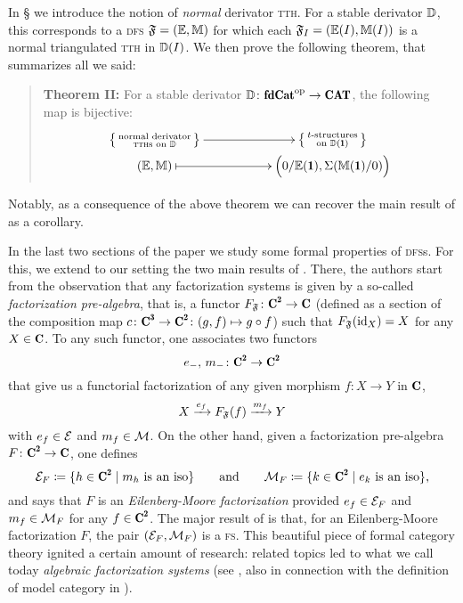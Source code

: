 In § we introduce the notion of \emph{normal} derivator \textsc{tth}. For a stable derivator $\mathbb{D}$, this corresponds to a \textsc{dfs} $\mathfrak{F}=(\mathbb E,\mathbb M)$ for which each $\mathfrak{F}_I=(\mathbb E(I),\mathbb M(I))$ is a normal triangulated \textsc{tth} in $\mathbb{D}(I)$. We then prove the following theorem, that summarizes all we said:
\begin{quote}
\textbf{Theorem II:} For a stable derivator $\D\colon \fincat^\opp\to \Cat$, the following map is bijective:
\[
\xymatrix@R=0pt{
\left\{
{\begin{smallmatrix}
\text{normal derivator}\\
\text{\textsc{tth}s on }\D
\end{smallmatrix}}
\right\}
\ar[rr] &&
\left\{
{\begin{smallmatrix}
\text{$t$-structures}\\
\text{on }\D(\uno)
\end{smallmatrix}}
\right\}\\
(\mathbb E,\mathbb M) \ar@{|->}[rr]&& \Big(0/\mathbb E(\uno), \Sigma(\mathbb M(\uno)/0)\Big) 
}
\]
\end{quote}
Notably, as a consequence of the above theorem we can recover the main result of \cite{Fiorenza2014} as a corollary.

In the last two sections of the paper we study some formal properties of \textsc{dfs}s. For this, we extend to our setting the two main results of \cite{Korostenski199357}. There, the authors start from the observation that any factorization systems is given by a so-called \emph{factorization pre-algebra}, that is, a functor $F_\F\colon \C^\due \to \C$ (defined as a section of the composition map $c\colon \C^\tre \to \C^\due\colon (g,f)\mapsto g\circ f$) such that $F_{\mathfrak{F}}(\operatorname{id}_X)=X$ for any $X\in \C$. To any such functor, one associates two functors
\[
e_{-},\, m_{-}\colon \C^\due\to \C^\due
\]
that give us a functorial factorization of any given morphism $f\colon X\to Y$ in $\C$,  
\[
X\xrightarrow{e_f}F_{\mathfrak{F}}(f)\xrightarrow{m_f}Y
\] 
with $e_f\in \mathcal{E}$ and $m_f\in \mathcal{M}$. On the other hand, given a factorization pre-algebra $F\colon \C^\due \to \C$, one defines
\[
\E_F \coloneqq \{h\in \C^\due \mid m_h\text{ is an iso}\}\qquad\text{and}\qquad
\M_F \coloneqq \{k\in \C^\due \mid e_k\text{ is an iso}\},
\]
and says that $F$ is an \emph{Eilenberg\hyp{}Moore factorization} provided $e_f\in \mathcal{E}_F$ and $m_f\in \mathcal{M}_F$ for any $f\in \C^\due$. The major result of \cite[\athm\textbf{A}]{Korostenski199357} is that, for an Eilenberg\hyp{}Moore factorization $F$, the pair $(\mathcal{E}_F,\mathcal{M}_F)$ is a \textsc{fs}. This beautiful piece of formal category theory  ignited a certain amount of research: related topics led to what we call today \emph{algebraic factorization systems} (see \cite{Gar,grandis2006natural}, also in connection with the definition of model category in \cite{riehl2011algebraic}).

